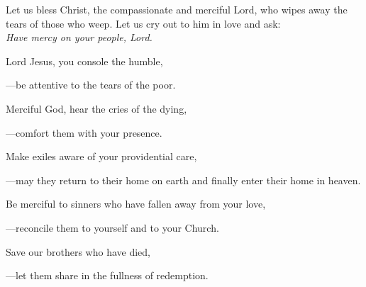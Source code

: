 \intercessions\indent

\begin{hangpar}

Let us bless Christ, the compassionate and merciful Lord, who wipes away the tears of those who weep. Let us cry out to him in love and ask:\\
\emph{Have mercy on your people, Lord.}

\medskip Lord Jesus, you console the humble,

{\color{red}---\thinspace}be attentive to the tears of the poor.

\medskip Merciful God, hear the cries of the dying,

{\color{red}---\thinspace}comfort them with your presence.

\medskip Make exiles aware of your providential care,

{\color{red}---\thinspace}may they return to their home on earth and finally enter their home in heaven.

\medskip Be merciful to sinners who have fallen away from your love,

{\color{red}---\thinspace}reconcile them to yourself and to your Church.

\medskip Save our brothers who have died,

{\color{red}---\thinspace}let them share in the fullness of redemption.

\end{hangpar}

